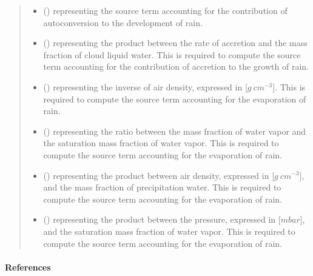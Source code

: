 \documentclass[letterpaper,10pt,english]{sphinxmanual}
\begin{document}
\begin{fulllineitems}
\begin{fulllineitems}
\begin{quote}
\begin{description}
\begin{itemize}
\item {} 
 () \textendash{}  representing the source term accounting for the contribution of autoconversion to
the development of rain.

\item {} 
 () \textendash{}  representing the product between the rate of accretion and the mass fraction of
cloud liquid water.
This is required to compute the source term accounting for the contribution of accretion to the growth of rain.

\item {} 
 () \textendash{}  representing the inverse of air density, expressed in {[}\(g ~ cm^{-3}\){]}.
This is required to compute the source term accounting for the evaporation of rain.

\item {} 
 () \textendash{}  representing the ratio between the mass fraction of water vapor and the saturation
mass fraction of water vapor.
This is required to compute the source term accounting for the evaporation of rain.

\item {} 
 () \textendash{}  representing the product between air density, expressed in {[}\(g ~ cm^{-3}\){]},
and the mass fraction of precipitation water.
This is required to compute the source term accounting for the evaporation of rain.

\item {} 
 () \textendash{}  representing the product between the pressure, expressed in {[}\(mbar\){]}, and the
saturation mass fraction of water vapor.
This is required to compute the source term accounting for the evaporation of rain.

\end{itemize}


\end{description}\end{quote}
\paragraph{References}


\end{fulllineitems}
\end{fulllineitems}
\end{document}

